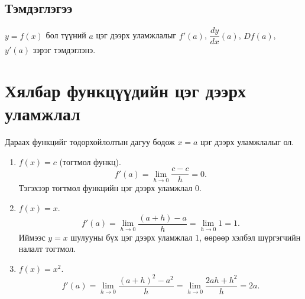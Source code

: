 \begin{center}
\end{center}

\subsection*{Тэмдэглэгээ}
$y=f(x)$ бол түүний $a$ цэг дээрх уламжлалыг $f'(a)$, $\dfrac{dy}{dx}(a)$, $Df(a)$, $y'(a)$ зэрэг тэмдэглэнэ.
\section{Хялбар функцүүдийн цэг дээрх уламжлал}

\begin{example}
Дараах функцийг тодорхойлолтын дагуу бодож $x=a$ цэг дээрх уламжлалыг ол.
\begin{enumerate}
  \item $f(x)=c$ (тогтмол функц).  
  \[
  f'(a)=\lim_{h\to0}\frac{c-c}{h}=0.
  \]
  Тэгэхээр тогтмол функцийн цэг дээрх уламжлал $0$.
  
  \item $f(x)=x$.  
  \[
  f'(a)=\lim_{h\to0}\frac{(a+h)-a}{h}=\lim_{h\to0}1=1.
  \]
  Иймээс $y=x$ шулууны бүх цэг дээрх уламжлал $1$, өөрөөр хэлбэл шүргэгчийн налалт тогтмол.
  
  \item $f(x)=x^2$.  
  \[
  f'(a)=\lim_{h\to0}\frac{(a+h)^2-a^2}{h}=\lim_{h\to0}\frac{2ah+h^2}{h}=2a.
  \]
\end{enumerate}
\end{example}
